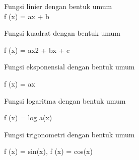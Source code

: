 \documentclass{article}
\begin{document}
\begin{eulernotebook}
\begin{eulercomment}
\begin{eulercomment}
\begin{eulercomment}
\begin{eulercomment}
\begin{eulercomment}
Fungsi linier dengan bentuk umum\\
f (x) = ax + b
\end{eulercomment}
\begin{eulercomment}
Fungsi kuadrat dengan bentuk umum

f (x) = ax2 + bx + c
\end{eulercomment}
\begin{eulercomment}
Fungsi eksponensial dengan bentuk umum

f (x) = ax
\end{eulercomment}
\begin{eulercomment}
Fungsi logaritma dengan bentuk umum

f (x) = log a(x)

\end{eulercomment}
\begin{eulercomment}
Fungsi trigonometri dengan bentuk umum

f (x) = sin(x), f (x) = cos(x)


\end{eulercomment}
\end{eulercomment}
\end{eulercomment}
\end{eulercomment}
\end{eulercomment}
\end{eulernotebook}
\end{document}

